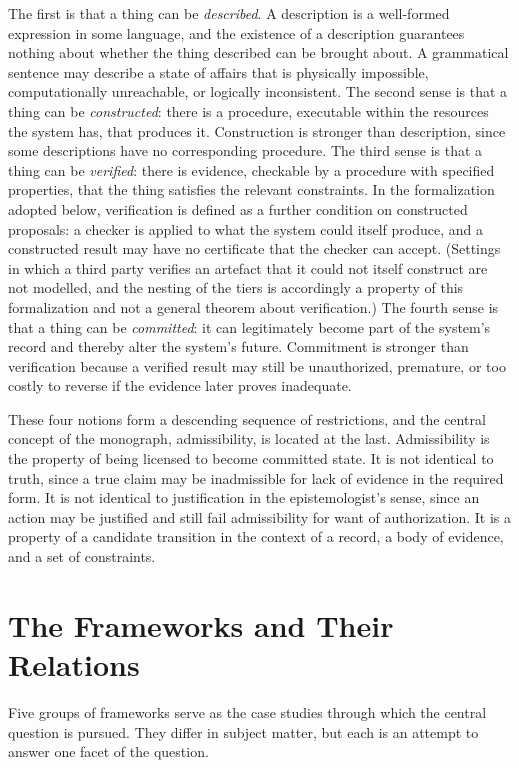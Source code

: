 \documentclass[11pt,twoside,openright]{book}
\theoremstyle{plain}
\theoremstyle{definition}
\theoremstyle{remark}
\begin{document}
The first is that a thing can be \emph{described}. A description is a well-formed expression in some language, and the existence of a description guarantees nothing about whether the thing described can be brought about. A grammatical sentence may describe a state of affairs that is physically impossible, computationally unreachable, or logically inconsistent. The second sense is that a thing can be \emph{constructed}: there is a procedure, executable within the resources the system has, that produces it. Construction is stronger than description, since some descriptions have no corresponding procedure. The third sense is that a thing can be \emph{verified}: there is evidence, checkable by a procedure with specified properties, that the thing satisfies the relevant constraints. In the formalization adopted below, verification is defined as a further condition on constructed proposals: a checker is applied to what the system could itself produce, and a constructed result may have no certificate that the checker can accept. (Settings in which a third party verifies an artefact that it could not itself construct are not modelled, and the nesting of the tiers is accordingly a property of this formalization and not a general theorem about verification.) The fourth sense is that a thing can be \emph{committed}: it can legitimately become part of the system's record and thereby alter the system's future. Commitment is stronger than verification because a verified result may still be unauthorized, premature, or too costly to reverse if the evidence later proves inadequate.

These four notions form a descending sequence of restrictions, and the central concept of the monograph, admissibility, is located at the last. Admissibility is the property of being licensed to become committed state. It is not identical to truth, since a true claim may be inadmissible for lack of evidence in the required form. It is not identical to justification in the epistemologist's sense, since an action may be justified and still fail admissibility for want of authorization. It is a property of a candidate transition in the context of a record, a body of evidence, and a set of constraints.

\section{The Frameworks and Their Relations}

Five groups of frameworks serve as the case studies through which the central question is pursued. They differ in subject matter, but each is an attempt to answer one facet of the question.
\end{document}

